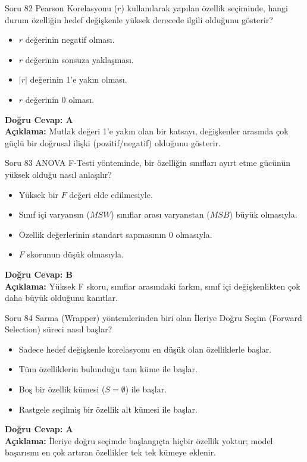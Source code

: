 \documentclass[12pt,a4paper]{article}
\begin{document}
\begin{testcard}{Soru 82}
    Pearson Korelasyonu ($r$) kullanılarak yapılan özellik seçiminde, hangi durum özelliğin hedef değişkenle yüksek derecede ilgili olduğunu gösterir?
    \begin{itemize}
        \item[A)] $r$ değerinin negatif olması.
        \item[B)] $r$ değerinin sonsuza yaklaşması.
        \item[C)] $|r|$ değerinin 1'e yakın olması.
        \item[D)] $r$ değerinin 0 olması.
    \end{itemize}
    \tcblower
    \textbf{Doğru Cevap: A} \\
    \textbf{Açıklama:} Mutlak değeri 1'e yakın olan bir katsayı, değişkenler arasında çok güçlü bir doğrusal ilişki (pozitif/negatif) olduğunu gösterir.
\end{testcard}

\begin{testcard}{Soru 83}
    ANOVA F-Testi yönteminde, bir özelliğin sınıfları ayırt etme gücünün yüksek olduğu nasıl anlaşılır?
    \begin{itemize}
        \item[A)] Yüksek bir $F$ değeri elde edilmesiyle.
        \item[B)] Sınıf içi varyansın ($MSW$) sınıflar arası varyanstan ($MSB$) büyük olmasıyla.
        \item[C)] Özellik değerlerinin standart sapmasının 0 olmasıyla.
        \item[D)] $F$ skorunun düşük olmasıyla.
    \end{itemize}
    \tcblower
    \textbf{Doğru Cevap: B} \\
    \textbf{Açıklama:} Yüksek F skoru, sınıflar arasındaki farkın, sınıf içi değişkenlikten çok daha büyük olduğunu kanıtlar.
\end{testcard}

\begin{testcard}{Soru 84}
    Sarma (Wrapper) yöntemlerinden biri olan İleriye Doğru Seçim (Forward Selection) süreci nasıl başlar?
    \begin{itemize}
        \item[A)] Sadece hedef değişkenle korelasyonu en düşük olan özelliklerle başlar.
        \item[B)] Tüm özelliklerin bulunduğu tam küme ile başlar.
        \item[C)] Boş bir özellik kümesi ($S = \emptyset$) ile başlar.
        \item[D)] Rastgele seçilmiş bir özellik alt kümesi ile başlar.
    \end{itemize}
    \tcblower
    \textbf{Doğru Cevap: A} \\
    \textbf{Açıklama:} İleriye doğru seçimde başlangıçta hiçbir özellik yoktur; model başarısını en çok artıran özellikler tek tek kümeye eklenir.
\end{testcard}
\end{document}
